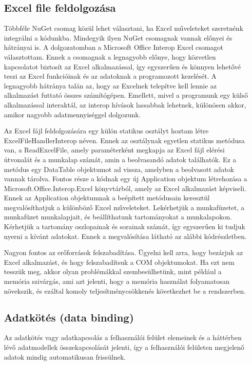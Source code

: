 \documentclass[
]{thesis-ekf}
\theoremstyle{definition}
\theoremstyle{remark}
\begin{document}
\subsection{Excel file feldolgozása}

Többféle NuGet csomag közül lehet választani, ha Excel műveleteket szeretnénk integrálni a kódunkba. Mindegyik ilyen NuGet csomagnak vannak előnyei és hátrányai is. A dolgozatomban a Microsoft Office Interop Excel csomagot választottam. Ennek a csomagnak a legnagyobb előnye, hogy közvetlen kapcsolatot biztosít az Excel alkalmazással, így egyszerűen és könnyen lehetővé teszi az Excel funkcióinak és az adatoknak a programozott kezelését. A legnagyobb hátránya talán az, hogy az Excelnek telepítve kell lennie az alkalmazást futtató összes számítógépen. Emellett, mivel a programunk egy külső alkalmazással interaktál, az interop hívások lassabbak lehetnek, különösen akkor, amikor nagyobb adatmennyiséggel dolgozunk. 

Az Excel fájl feldolgozására egy külön statikus osztályt hoztam létre ExcelFileHandlerInterop néven. Ennek az osztálynak egyetlen statikus metódusa van, a ReadExcelFile, amely paraméterként megkapja az Excel fájl elérési útvonalát és a munkalap számát, amin a beolvasandó adatok találhatók. Ez a metódus egy DataTable objektumot ad vissza, amelyben a beolvasott adatok vannak tárolva. Fontos része a kódnak egy új Application objektum létrehozása a Microsoft.Office.Interop.Excel könyvtárból, amely az Excel alkalmazást képviseli. Ennek az Application objektumnak a beépített metódusain keresztül megvalósíthatjuk a különböző Excel műveleteket. Lekérhetjük a munkafüzetet, a munkafüzet munkalapjait, és beállíthatunk tartományokat a munkalapokon. Kérhetjük a tartomány oszlopainak és sorainak számát, így egyszerűen ki tudjuk nyerni a kívánt adatokat. Ennek a megvalósítása látható az alábbi kódrészletben.



Nagyon fontos az erőforrások felszabadítása. Ügyelni kell arra, hogy bezárjuk az Excel alkalmazást, és hogy felszabadítsuk a COM objektumokat. Ha ezt nem tesszük meg, akkor olyan problémákkal szembesülhetünk, mint például a memória szivárgás, ami azt jelenti, hogy a memória használat folyamatosan növekszik, és ezáltal komoly teljesítménycsökkenés következhet be a rendszerben.
\subsection{Adatkötés (data binding) \cite{Binding} \cite{WPF}}
Az adatkötés vagy adatkapcsolás a felhasználói felület elemeinek és a háttérben lévő adatmodellek összekapcsolását jelenti, így a felhasználói felületen megjelenő adatok mindig automatikusan frissülnek.
\end{document}
